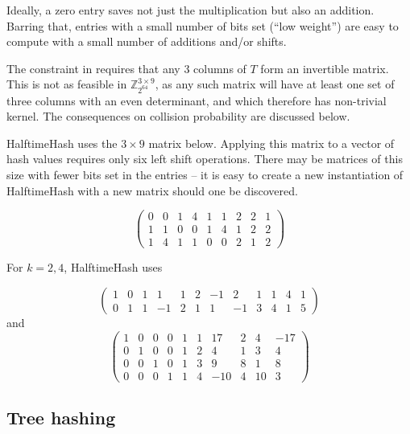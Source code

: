 \documentclass[sigconf, nonacm]{acmart}
\newcommand{\ints}{\mathbb{Z}}
\begin{document}
Ideally, a zero entry saves not just the multiplication but also an addition.
Barring that, entries with a small number of bits set (``low weight'') are easy to compute with a small number of additions and/or shifts.

The constraint in \cite{ehc-nandi} requires that any 3 columns of $T$ form an invertible matrix.
This is not as feasible in $\ints_{2^{64}}^{3 \times 9}$, as any such matrix will have at least one set of three columns with an even determinant, and which therefore has non-trivial kernel.
The consequences on collision probability are discussed below.

HalftimeHash uses the $3 \times 9$ matrix below.
Applying this matrix to a vector of hash values requires only six left shift operations.
There may be matrices of this size with fewer bits set in the entries -- it is easy to create a new instantiation of HalftimeHash with a new matrix should one be discovered.

\begin{displaymath}
  \left(
\begin{array}{rrrrrrrrr}
  0 & 0 & 1 & 4 & 1 & 1 & 2 & 2 & 1\\
  1 & 1 & 0 & 0 & 1 & 4 & 1 & 2 & 2\\
  1 & 4 & 1 & 1 & 0 & 0 & 2 & 1 & 2
\end{array}
\right)
\end{displaymath}

For $k = 2, 4$, HalftimeHash uses

\[
\left(
\begin{array}{rrrrrrrrrrrr}
  1 & 0 & 1 & 1 & 1 & 2 & -1 & 2 & 1 & 1 & 4 & 1\\
  0 & 1 & 1 & -1 & 2 & 1 & 1 & -1 & 3 & 4 & 1 & 5
\end{array}
\right)
\]
and
\[
\left(
\begin{array}{rrrrrrrrrr}
  1 &  0 &   0&   0&   1&   1&  17&   2&   4& -17 \\
  0  & 1&   0  & 0&   1  & 2&   4  & 1&   3  & 4\\
  0 &  0 &  1 &  0 &  1 &  3 &  9 &  8 &  1 &  8\\
  0&   0  & 0&   1  & 1&   4 &-10&   4  &10&   3
\end{array}
\right)
\]


\subsection{Tree hashing}
\end{document}
